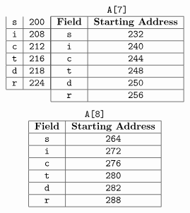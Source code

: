 \documentclass[9pt]{article}
\begin{document}
\begin{enumerate}
\begin{enumerate}
$$\begin{tabular}{@{}|c|c|@{}}
                     \verb|s| & \verb|200| \\ \hline
                     \verb|i| & \verb|208| \\ \hline
                     \verb|c| & \verb|212| \\ \hline
                     \verb|t| & \verb|216| \\ \hline
                     \verb|d| & \verb|218| \\ \hline
                     \verb|r| & \verb|224| \\ \hline
                  \end{tabular}
                  \begin{tabular}{@{}|c|c|@{}}
                     \multicolumn{2}{c}{\texttt{A[7]}} \\ \hline
                     \textbf{Field} & \textbf{Starting Address} \\ \hline
                     \verb|s| & \verb|232| \\ \hline
                     \verb|i| & \verb|240| \\ \hline
                     \verb|c| & \verb|244| \\ \hline
                     \verb|t| & \verb|248| \\ \hline
                     \verb|d| & \verb|250| \\ \hline
                     \verb|r| & \verb|256| \\ \hline
                  \end{tabular}
               $$
               $$
                  \begin{tabular}{@{}|c|c|@{}}
                     \multicolumn{2}{c}{\texttt{A[8]}} \\ \hline
                     \textbf{Field} & \textbf{Starting Address} \\ \hline
                     \verb|s| & \verb|264| \\ \hline
                     \verb|i| & \verb|272| \\ \hline
                     \verb|c| & \verb|276| \\ \hline
                     \verb|t| & \verb|280| \\ \hline
                     \verb|d| & \verb|282| \\ \hline
                     \verb|r| & \verb|288| \\ \hline
                  \end{tabular}
                  \begin{tabular}{@{}|c|c|@{}}

\end{tabular}$$
\end{enumerate}
\end{enumerate}
\end{document}
